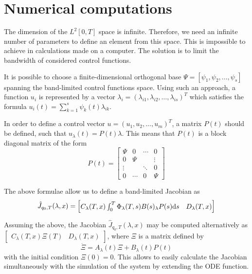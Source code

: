 \section{Numerical computations}
The dimension of the $L^2[0,T]$ space is infinite. Therefore, we need an infinite number of parameters to define an element from this space. This is impossible to achieve in calculations made on a computer. The solution is to limit the bandwidth of considered control functions. 

It is possible to choose a finite-dimensional orthogonal base $\Psi = [ \psi_1, \psi_2, \dots, \psi_s ]$ spanning the band-limited control functions space. 
Using such an approach, a function $u_i$ is represented by a vector 
$\lambda_i = (\lambda_{i1}, \lambda_{i2}, \dots, \lambda_{is})^T$ 
which satisfies the formula $u_i(t) = \sum_{k=1}^s \psi_k(t) \lambda_{ik}$.

In order to define a control vector $u=(u_1, u_2, \dots, u_m)^T$, a matrix $P(t)$ should be defined, such that $u_\lambda(t)=P(t)\lambda$. This means that $P(t)$ is a block diagonal matrix of the form
\begin{equation}
\label{eq:Pt}
P(t)=\begin{bmatrix}
\Psi & 0 & \cdots & 0\\
0 & \Psi &  & \vdots\\
\vdots &  & \ddots & 0 \\
0 &  \cdots & 0 & \Psi
\end{bmatrix}
\end{equation}

The above formulae allow us to define a band-limited Jacobian as \cite{ecs_ijc}
\begin{equation}
\hat J_{q_0, T}(\lambda, x)=\begin{bmatrix}C_\lambda(T,x)\int_0^T \Phi_\lambda(T,s)B(s)_\lambda P(s)\mathrm{d} s & D_\lambda(T,x)\end{bmatrix}
\end{equation}

Assuming the above, the Jacobian $\hat J_{q_0, T}(\lambda, x)$
may be computed alternatively as\\ $\begin{bmatrix}
C_\lambda(T,x)\Xi(T)& D_\lambda(T,x)
\end{bmatrix}$, where $\Xi$ is a matrix defined by  
\begin{equation}
\dot \Xi = A_\lambda(t)\Xi +B_\lambda(t)P(t)
\end{equation}
with the initial condition $\Xi(0)=0$. %
This allows to easily calculate the Jacobian simultaneously with the simulation
of the system by extending the ODE function.

